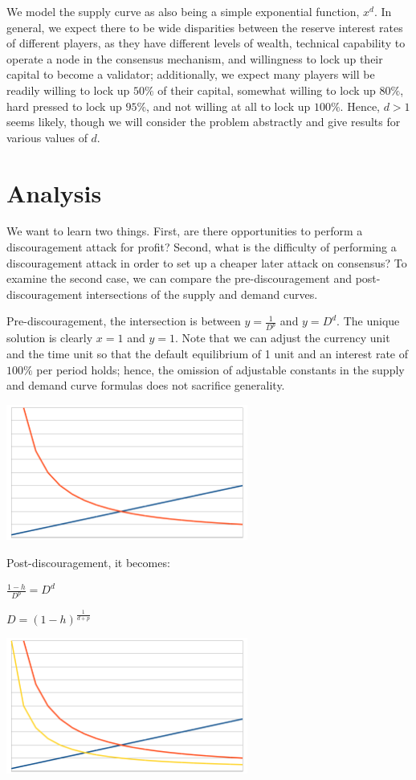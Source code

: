 \documentclass[12pt]{article}
\begin{document}
We model the supply curve as also being a simple exponential function, $x^d$. In general, we expect there to be wide disparities between the reserve interest rates of different players, as they have different levels of wealth, technical capability to operate a node in the consensus mechanism, and willingness to lock up their capital to become a validator; additionally, we expect many players will be readily willing to lock up $50\%$ of their capital, somewhat willing to lock up $80\%$, hard pressed to lock up $95\%$, and not willing at all to lock up $100\%$. Hence, $d > 1$ seems likely, though we will consider the problem abstractly and give results for various values of $d$.

\section{Analysis}

We want to learn two things. First, are there opportunities to perform a discouragement attack for profit? Second, what is the difficulty of performing a discouragement attack in order to set up a cheaper later attack on consensus? To examine the second case, we can compare the pre-discouragement and post-discouragement intersections of the supply and demand curves.

Pre-discouragement, the intersection is between $y = \frac{1}{D^p}$ and $y = D^d$. The unique solution is clearly $x=1$ and $y=1$. Note that we can adjust the currency unit and the time unit so that the default equilibrium of 1 unit and an interest rate of $100\%$ per period holds; hence, the omission of adjustable constants in the supply and demand curve formulas does not sacrifice generality.

\includegraphics[width=300px]{disc_chart1.png}

Post-discouragement, it becomes:

$\frac{1-h}{D^p} = D^d$

$D=(1-h)^{\frac{1}{d+p}}$

\includegraphics[width=300px]{disc_chart2.png}
\end{document}
